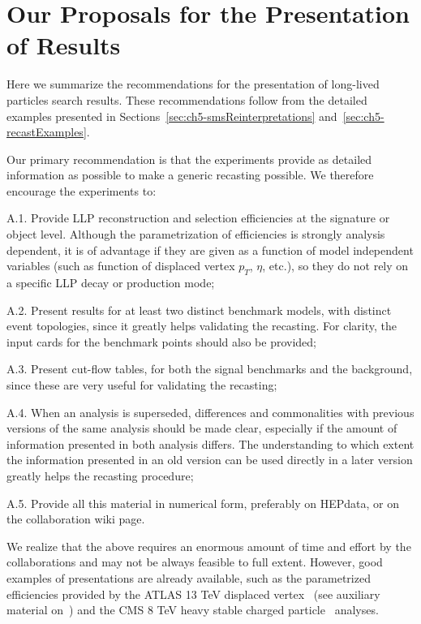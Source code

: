 \section{Our Proposals for the Presentation of Results}
\label{sec:ch5-rec_summary}

Here we summarize the recommendations for the presentation of long-lived
particles search results. These recommendations follow from the detailed
examples presented in Sections~\ref{sec:ch5-smsReinterpretations} 
and~\ref{sec:ch5-recastExamples}.

Our primary recommendation is that the experiments provide as detailed
information as possible to make a generic recasting possible. 
We therefore encourage the experiments to: 
\begin{description*}
  \item[A.1.] Provide LLP reconstruction and selection efficiencies
  at the signature or object level. Although the parametrization
  of efficiencies is strongly analysis dependent,
  it is of advantage if they are given as a function of model independent 
  variables (such as function of displaced vertex $p_T$, $\eta$, etc.), so 
  they do not rely on a specific LLP decay or production mode;
  \item[A.2.] Present results for at least two distinct benchmark
  models, with distinct event topologies, since it greatly helps 
  validating the recasting. For clarity, the input cards for the benchmark 
  points should also be provided;  
  \item[A.3.] Present cut-flow tables, for both the signal
    benchmarks and the background, since these are  very useful for
    validating the recasting;
  \item[A.4.]  When an analysis is superseded, differences and commonalities with previous
   versions of the same analysis should be made clear, especially if the amount of information 
   presented in both analysis differs. The understanding to which extent 
   the information presented in an old version can be used directly in a later version greatly 
   helps the recasting procedure;
  \item[A.5.] Provide all this material in numerical form, preferably on HEPdata, or on the 
  collaboration wiki page.
\end{description*}

\noindent 
We realize that the above requires an enormous amount of time and effort by 
the collaborations and may not be always feasible to full extent. 
However, good examples of presentations are already available, such as
the parametrized efficiencies provided by the ATLAS 13 TeV displaced
vertex~\cite{Aaboud:2017iio} (see auxiliary material on~\cite{SUSY-2016-08}) and the CMS 8 TeV heavy stable
charged particle~\cite{Khachatryan:2015lla} analyses.

